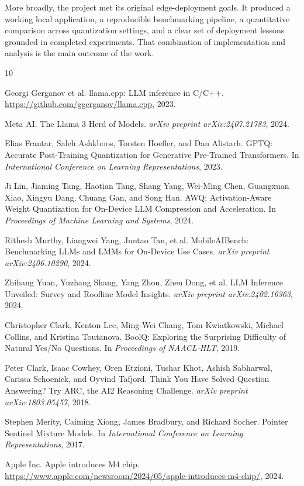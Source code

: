 \documentclass{article}
\begin{document}
More broadly, the project met its original edge-deployment goals. It produced a working local application, a reproducible benchmarking pipeline, a quantitative comparison across quantization settings, and a clear set of deployment lessons grounded in completed experiments. That combination of implementation and analysis is the main outcome of the work.


\begin{thebibliography}{10}

Georgi Gerganov et al.
\newblock llama.cpp: LLM inference in C/C++.
\newblock \url{https://github.com/ggerganov/llama.cpp}, 2023.

Meta AI.
\newblock The Llama 3 Herd of Models.
\newblock \emph{arXiv preprint arXiv:2407.21783}, 2024.

Elias Frantar, Saleh Ashkboos, Torsten Hoefler, and Dan Alistarh.
\newblock GPTQ: Accurate Post-Training Quantization for Generative Pre-Trained Transformers.
\newblock In \emph{International Conference on Learning Representations}, 2023.

Ji Lin, Jiaming Tang, Haotian Tang, Shang Yang, Wei-Ming Chen, Guangxuan Xiao,
Xingyu Dang, Chuang Gan, and Song Han.
\newblock AWQ: Activation-Aware Weight Quantization for On-Device LLM Compression and Acceleration.
\newblock In \emph{Proceedings of Machine Learning and Systems}, 2024.

Rithesh Murthy, Liangwei Yang, Juntao Tan, et al.
\newblock MobileAIBench: Benchmarking LLMs and LMMs for On-Device Use Cases.
\newblock \emph{arXiv preprint arXiv:2406.10290}, 2024.

Zhihang Yuan, Yuzhang Shang, Yang Zhou, Zhen Dong, et al.
\newblock LLM Inference Unveiled: Survey and Roofline Model Insights.
\newblock \emph{arXiv preprint arXiv:2402.16363}, 2024.

Christopher Clark, Kenton Lee, Ming-Wei Chang, Tom Kwiatkowski,
Michael Collins, and Kristina Toutanova.
\newblock BoolQ: Exploring the Surprising Difficulty of Natural Yes/No Questions.
\newblock In \emph{Proceedings of NAACL-HLT}, 2019.

Peter Clark, Isaac Cowhey, Oren Etzioni, Tushar Khot, Ashish Sabharwal,
Carissa Schoenick, and Oyvind Tafjord.
\newblock Think You Have Solved Question Answering? Try ARC, the AI2 Reasoning Challenge.
\newblock \emph{arXiv preprint arXiv:1803.05457}, 2018.

Stephen Merity, Caiming Xiong, James Bradbury, and Richard Socher.
\newblock Pointer Sentinel Mixture Models.
\newblock In \emph{International Conference on Learning Representations}, 2017.

Apple Inc.
\newblock Apple introduces M4 chip.
\newblock \url{https://www.apple.com/newsroom/2024/05/apple-introduces-m4-chip/}, 2024.

\end{thebibliography}
\end{document}
